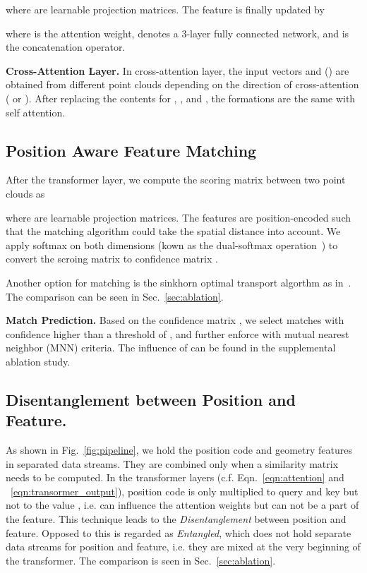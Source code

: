 where  are learnable projection matrices. The feature  is finally updated by

where  is the attention weight,  denotes a 3-layer fully connected network, and  is the concatenation operator.

\medskip
\noindent
\textbf{Cross-Attention Layer.}
In cross-attention layer, the input vectors  and () are obtained from different point clouds depending on the direction of cross-attention ( or  ). After replacing the contents for , , and , the formations are the same with self attention.





\subsection{Position Aware Feature Matching}\label{sec:matching}

After the transformer layer, we compute the scoring matrix  between two point clouds as 

where  are learnable projection matrices.
The features are position-encoded such that the matching algorithm could take the spatial distance into account.
We apply softmax on both dimensions (kown as the dual-softmax operation~\cite{sun2021loftr,rocco2018neighbourhood}) to convert the scroing matrix to confidence matrix .

Another option for matching is the sinkhorn optimal transport algorthm as in~\cite{sarlin2020superglue}. The  comparison can be seen in Sec.~\ref{sec:ablation}.

\medskip
\noindent
\textbf{Match Prediction.}
Based on the confidence matrix , we select matches with confidence higher than a threshold of , and further enforce with mutual nearest neighbor (MNN) criteria. The influence of  can be found in the supplemental ablation study.


\subsection{Disentanglement between Position and Feature.}
As shown in Fig.~\ref{fig:pipeline}, we hold the position code and geometry features in separated data streams. They are combined only when a similarity matrix needs to be computed.  In the transformer layers  (c.f. Eqn.~\ref{eqn:attention} and ~\ref{eqn:transormer_output}), position code  is only multiplied to query  and key  but not to the value , i.e.  can influence the attention weights but can not be a part of the feature.  
This technique leads to the \textit{Disentanglement} between position and feature. 
Opposed to this is regarded as \textit{Entangled}, which does not hold separate data streams for position and feature, i.e. they are mixed at the very beginning of the transformer.
The comparison is seen in Sec.~\ref{sec:ablation}.


